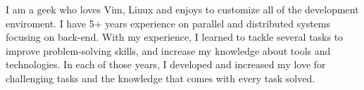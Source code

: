 

\begin{cvparagraph}

    I am a geek who loves Vim, Linux and enjoys to customize all of the
    development enviroment. I have 5+ years experience on parallel and
    distributed systems focusing on back-end. With my experience, I learned to
    tackle several tasks to improve problem-solving skills, and increase my
    knowledge about tools and technologies. In each of those years, I developed
    and increased my love for challenging tasks and the knowledge that comes
    with every task solved.

\end{cvparagraph}
